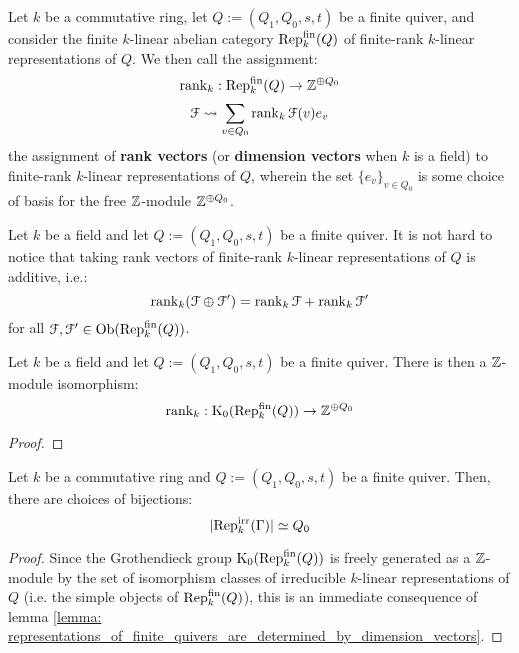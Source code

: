             \begin{definition} \label{def: dimension_vectors_of_quiver_representations}
                Let $k$ be a commutative ring, let $Q := (Q_1, Q_0, s, t)$ be a finite quiver, and consider the finite $k$-linear abelian category $\mathrm{Rep}_k^{\mathrm{fin}}(Q)$ of finite-rank $k$-linear representations of $Q$. We then call the assignment:
                    $$\operatorname{rank}_k: \mathrm{Rep}_k^{\mathrm{fin}}(Q) \to \mathbb{Z}^{\oplus Q_0}$$
                    $$\mathcal{F} \leadsto \sum_{v \in Q_0} \operatorname{rank}_k \mathcal{F}(v) e_v$$
                the assignment of \textbf{rank vectors} (or \textbf{dimension vectors} when $k$ is a field) to finite-rank $k$-linear representations of $Q$, wherein the set $\{e_v\}_{v \in Q_0}$ is some choice of basis for the free $\mathbb{Z}$-module $\mathbb{Z}^{\oplus Q_0}$.
            \end{definition}
            \begin{remark}
                Let $k$ be a field and let $Q := (Q_1, Q_0, s, t)$ be a finite quiver. It is not hard to notice that taking rank vectors of finite-rank $k$-linear representations of $Q$ is additive, i.e.:
                    $$\operatorname{rank}_k (\mathcal{F} \oplus \mathcal{F}') = \operatorname{rank}_k \mathcal{F} + \operatorname{rank}_k \mathcal{F}'$$
                for all $\mathcal{F}, \mathcal{F}' \in \mathrm{Ob}(\mathrm{Rep}_k^{\mathrm{fin}}(Q))$. 
            \end{remark}
            \begin{lemma} \label{lemma: representations_of_finite_quivers_are_determined_by_dimension_vectors}
                Let $k$ be a field and let $Q := (Q_1, Q_0, s, t)$ be a finite quiver. There is then a $\mathbb{Z}$-module isomorphism:
                    $$\operatorname{rank}_k: \mathrm{K}_0(\mathrm{Rep}_k^{\mathrm{fin}}(Q)) \to \mathbb{Z}^{\oplus Q_0}$$
            \end{lemma}
                \begin{proof}
                    
                \end{proof}
            \begin{corollary} \label{coro: irreducible_representations_of_finite_quivers_are_labelled_by_vertices}
                Let $k$ be a commutative ring and $Q := (Q_1, Q_0, s, t)$ be a finite quiver. Then, there are choices of bijections:
                    $$|\mathrm{Rep}_k^{\mathrm{irr}}(\Gamma)| \simeq Q_0$$
            \end{corollary}
                \begin{proof}
                    Since the Grothendieck group $\mathrm{K}_0(\mathrm{Rep}_k^{\mathrm{fin}}(Q))$ is freely generated as a $\mathbb{Z}$-module by the set of isomorphism classes of irreducible $k$-linear representations of $Q$ (i.e. the simple objects of $\mathrm{Rep}_k^{\mathrm{fin}}(Q)$), this is an immediate consequence of lemma \ref{lemma: representations_of_finite_quivers_are_determined_by_dimension_vectors}.
                \end{proof}

